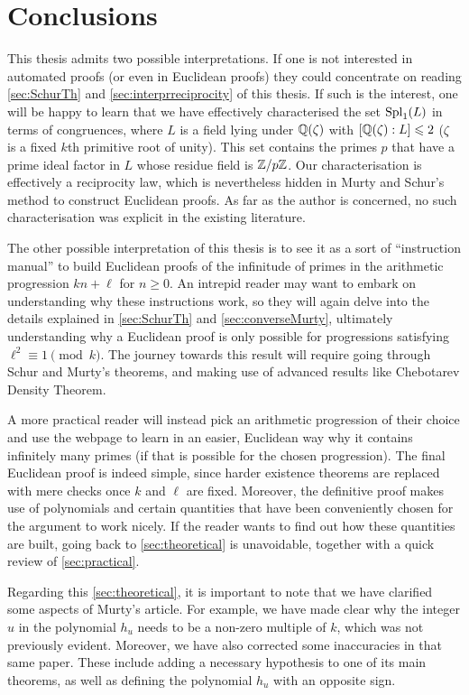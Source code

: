 \documentclass[../main.tex]{subfiles}
\begin{document}
\section{Conclusions}\label{sec:conclusions}

This thesis admits two possible interpretations. If one is not interested in automated proofs (or even in Euclidean proofs) they could concentrate on reading \cref{sec:SchurTh} and \cref{sec:interprreciprocity} of this thesis. If such is the interest, one will be happy to learn that we have effectively characterised the set $\operatorname{Spl}_1(L)$ in terms of congruences, where $L$ is a field lying under $\mathbb{Q}(\zeta)$ with $[\mathbb{Q}(\zeta):L]\leqslant 2$ ($\zeta$ is a fixed $k$th primitive root of unity). This set contains the primes $p$ that have a prime ideal factor in $L$ whose residue field is $\mathbb{Z}/p\mathbb{Z}$. Our characterisation is effectively a reciprocity law, which is nevertheless hidden in Murty and Schur's method to construct Euclidean proofs. As far as the author is concerned, no such characterisation was explicit in the existing literature. 

The other possible interpretation of this thesis is to see it as a sort of ``instruction manual'' to build Euclidean proofs of the infinitude of primes in the arithmetic progression $kn+\ell$ for $n\geqslant 0$. An intrepid reader may want to embark on understanding why these instructions work, so they will again delve into the details explained in \cref{sec:SchurTh} and \cref{sec:converseMurty}, ultimately understanding why a Euclidean proof is only possible for progressions satisfying $\ell^2\equiv 1 \pmod{k}$. The journey towards this result will require going through Schur and Murty's theorems, and making use of advanced results like Chebotarev Density Theorem. 

A more practical reader will instead pick an arithmetic progression of their choice and use the webpage to learn in an easier, Euclidean way why it contains infinitely many primes (if that is possible for the chosen progression). The final Euclidean proof is indeed simple, since harder existence theorems are replaced with mere checks once $k$ and $\ell$ are fixed. Moreover, the definitive proof makes use of polynomials and certain quantities that have been conveniently chosen for the argument to work nicely. If the reader wants to find out how these quantities are built, going back to \cref{sec:theoretical} is unavoidable, together with a quick review of \cref{sec:practical}.

Regarding this \cref{sec:theoretical}, it is important to note that we have clarified some aspects of Murty's article. For example, we have made clear why the integer $u$ in the polynomial $h_u$ needs to be a non-zero multiple of $k$, which was not previously evident. Moreover, we have also corrected some inaccuracies in that same paper. These include adding a necessary hypothesis to one of its main theorems, as well as defining the polynomial $h_u$ with an opposite sign.
\end{document}
